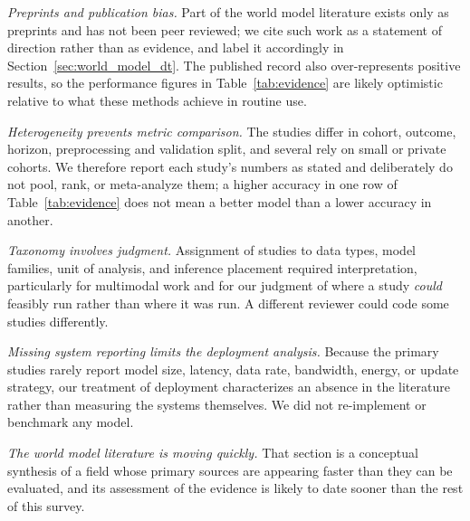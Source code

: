 \documentclass[journal]{IEEEtran}
\begin{document}
\emph{Preprints and publication bias.} Part of the world model literature exists only as preprints and has not been peer reviewed; we cite such work as a statement of direction rather than as evidence, and label it accordingly in Section~\ref{sec:world_model_dt}. The published record also over-represents positive results, so the performance figures in Table~\ref{tab:evidence} are likely optimistic relative to what these methods achieve in routine use.

\emph{Heterogeneity prevents metric comparison.} The studies differ in cohort, outcome, horizon, preprocessing and validation split, and several rely on small or private cohorts. We therefore report each study's numbers as stated and deliberately do not pool, rank, or meta-analyze them; a higher accuracy in one row of Table~\ref{tab:evidence} does not mean a better model than a lower accuracy in another.

\emph{Taxonomy involves judgment.} Assignment of studies to data types, model families, unit of analysis, and inference placement required interpretation, particularly for multimodal work and for our judgment of where a study \emph{could} feasibly run rather than where it was run. A different reviewer could code some studies differently.

\emph{Missing system reporting limits the deployment analysis.} Because the primary studies rarely report model size, latency, data rate, bandwidth, energy, or update strategy, our treatment of deployment characterizes an absence in the literature rather than measuring the systems themselves. We did not re-implement or benchmark any model.

\emph{The world model literature is moving quickly.} That section is a conceptual synthesis of a field whose primary sources are appearing faster than they can be evaluated, and its assessment of the evidence is likely to date sooner than the rest of this survey.

\fi
\end{document}
